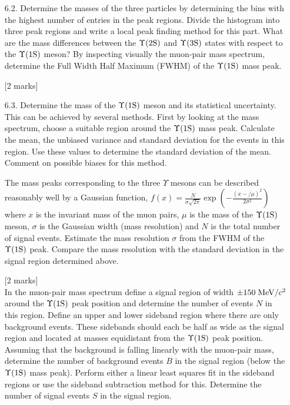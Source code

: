 \begin{enumerate}
\hfill [2 marks]


\item [6.2.] Determine the masses of the three particles by determining the bins with the highest number of entries in the peak regions. Divide the histogram into three peak regions and write a local peak finding method for this part.
What are the mass differences between the $\Upsilon \rm (2S)$ and $\Upsilon \rm (3S)$ states with respect to the $\Upsilon \rm (1S)$ meson? By inspecting visually the muon-pair mass
spectrum, determine the Full Width Half Maximum (FWHM) of the $\Upsilon \rm (1S)$ mass peak.

\hfill [2 marks]


\item [6.3.] Determine the mass of the  $\Upsilon \rm (1S)$  meson and its statistical uncertainty. This can be achieved by several methods. First by looking at the mass spectrum, choose a suitable region around the $\Upsilon \rm (1S)$  mass peak. Calculate the mean, the unbiased variance and standard deviation for the events in this region. Use these values to determine the standard deviation of the mean. Comment on possible biases for this method. 


The mass peaks corresponding to the three $\Upsilon$ mesons can be described 
reasonably well by a Gaussian function, 
$f(x) = \frac{N}{\sigma \sqrt{2\pi}}  \exp{\left( - \frac{(x-/\mu)^2}{2\sigma^2} \right)} $
where $x$ is the invariant mass of the muon pairs, $\mu$ is the mass of the $\Upsilon \rm (1S)$  meson, $\sigma$ is the Gaussian width (mass resolution) and $N$ is the total number of signal events. 
Estimate the mass resolution $\sigma$ from the FWHM of the $\Upsilon \rm (1S)$  peak. Compare the mass resolution with the standard deviation in the signal region determined above.

\hfill [2 marks]\\


In the muon-pair mass spectrum define a signal region of width $\pm 150\; {\rm MeV}/c^2$ around the $\Upsilon \rm (1S)$  peak position and determine the number of events $N$ in this region. 
Define an upper and lower sideband region where there are only background events. These sidebands should each be half as wide as the signal region and located at masses equidistant from the $\Upsilon \rm (1S)$  peak position. Assuming that the background is falling linearly with the muon-pair mass, determine the number of background events $B$ in the signal region (below the $\Upsilon \rm (1S)$  mass peak). Perform either a linear least squares fit in the sideband regions or use the sideband subtraction method for this. Determine the number of signal events $S$ in the signal region.


\end{enumerate}

